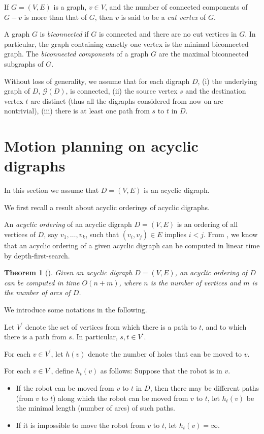 \documentclass{article}
\newtheorem{thm}{Theorem}
\begin{document}
If $G=(V,E)$ is a graph, $v \in V$, and the number of connected
components of $G-v$ is more than that of $G$, then $v$ is said to be
a \emph{cut vertex} of $G$.

A graph $G$ is \emph{biconnected} if $G$ is connected and there are
no cut vertices in $G$. In particular, the graph containing exactly
one vertex is the minimal biconnected graph. The \emph{biconnected
components} of a graph $G$ are the maximal biconnected subgraphs of
$G$.

\medskip \noindent Without loss of generality, we assume
that for each digraph $D$, (i) the underlying graph of $D$,
$\mathcal{G}(D)$, is connected, (ii) the source vertex $s$ and the
destination vertex $t$ are distinct (thus all the digraphs
considered from now on are nontrivial), (iii) there is at least one
path from $s$ to $t$ in $D$.





\section{Motion planning on acyclic digraphs}\label{sec:acyclic}
In this section we assume that $D=(V,E)$ is an acyclic digraph.

We first recall a result about acyclic orderings of acyclic
digraphs.

An \textit{acyclic ordering} of an acyclic digraph $D=(V,E)$ is an
ordering of all vertices of $D$, say $v_1,\dots,v_k$, such that
$(v_i,v_j) \in E$ implies $i<j$. From \cite{BangGutin00}, we know
that an acyclic ordering of a given acyclic digraph can be computed
in linear time by depth-first-search.

\begin{thm}[\cite{BangGutin00}]\label{thm:acyclic-ordering}
Given an acyclic digraph $D=(V,E)$, an acyclic ordering of $D$ can
be computed in time $O(n+m)$, where $n$ is the number of vertices
and $m$ is the number of arcs of $D$.
\end{thm}

We introduce some notations in the following.

Let $V^\prime$ denote the set of vertices from which there is a path
to $t$, and to which there is a path from $s$. In particular, $s,t
\in V^\prime$.

For each $v \in V^\prime$, let $h(v)$ denote the number of holes
that can be moved to $v$.

For each $v \in V^\prime$, define $h_t(v)$ as follows: Suppose that
the robot is in $v$.
\begin{itemize}
\item If the robot can be moved from $v$ to $t$ in $D$, then there
may be different paths (from $v$ to $t$) along which the robot can
be moved from $v$ to $t$, let $h_t(v)$ be the minimal length (number
of arcs) of such paths.

\item If it is impossible to move the robot from $v$ to $t$, let
$h_t(v)= \infty$.
\end{itemize}
\end{document}
